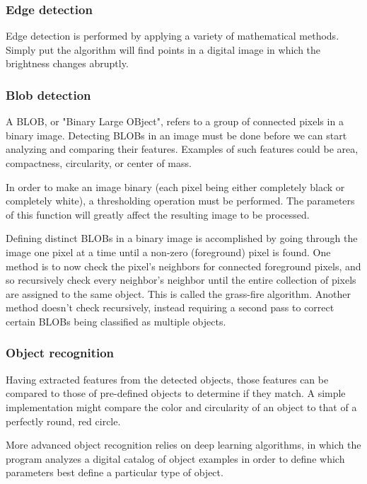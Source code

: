 			\subsubsection{Edge detection}
			
			Edge detection is performed by applying a variety of mathematical methods. Simply put the algorithm will find points in a digital image in which the brightness changes abruptly. 
			
			\subsubsection{Blob detection}
			
			A BLOB, or "Binary Large OBject", refers to a group of connected pixels in a binary image. Detecting BLOBs in an image must be done before we can start analyzing and comparing their features. Examples of such features could be area, compactness, circularity, or center of mass.
			
			In order to make an image binary (each pixel being either completely black or completely white), a thresholding operation must be performed. The parameters of this function will greatly affect the resulting image to be processed. 
			
			Defining distinct BLOBs in a binary image is accomplished by going through the image one pixel at a time until a non-zero (foreground) pixel is found. One method is to now check the pixel's neighbors for connected foreground pixels, and so recursively check every neighbor's neighbor until the entire collection of pixels are assigned to the same object. This is called the grass-fire algorithm. Another method doesn't check recursively, instead requiring a second pass to correct certain BLOBs being classified as multiple objects.
			
			
			\subsubsection{Object recognition}
				Having extracted features from the detected objects, those features can be compared to those of pre-defined objects to determine if they match. A simple implementation might compare the color and circularity of an object to that of a perfectly round, red circle. 
				
				More advanced object recognition relies on deep learning algorithms, in which the program analyzes a digital catalog of object examples in order to define which parameters best define a particular type of object.
			

